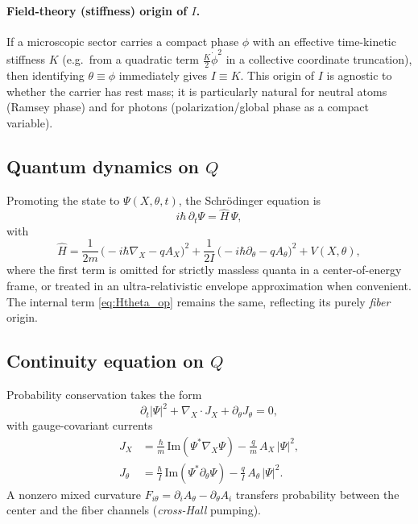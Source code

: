 \paragraph{Field-theory (stiffness) origin of $I$.}
If a microscopic sector carries a compact phase $\phi$ with an effective time-kinetic stiffness $K$
(e.g.\ from a quadratic term $\tfrac{K}{2}\dot\phi^2$ in a collective coordinate truncation), then identifying
$\theta\equiv \phi$ immediately gives $I\equiv K$. This origin of $I$ is agnostic to whether the carrier
has rest mass; it is particularly natural for neutral atoms (Ramsey phase) and for photons
(polarization/global phase as a compact variable).

\subsection{Quantum dynamics on $Q$}
Promoting the state to $\Psi(X,\theta,t)$, the Schrödinger equation is
\begin{equation}
i\hbar\,\partial_t \Psi=\hat H\,\Psi,
\end{equation}
with
\begin{equation}
\hat H=\frac{1}{2m}\,\big(-i\hbar\nabla_X-qA_X\big)^2
      +\frac{1}{2I}\,\big(-i\hbar\partial_\theta-qA_\theta\big)^2
      +V(X,\theta),
\label{eq:full_H}
\end{equation}
where the first term is omitted for strictly massless quanta in a center-of-energy frame, or treated in an
ultra-relativistic envelope approximation when convenient. The internal term
\eqref{eq:Htheta_op} remains the same, reflecting its purely \emph{fiber} origin.

\subsection{Continuity equation on $Q$}
Probability conservation takes the form
\begin{equation}
\partial_t|\Psi|^2+\nabla_X\!\cdot J_X+\partial_\theta J_\theta=0,
\end{equation}
with gauge-covariant currents
\begin{align}
J_X&=\frac{\hbar}{m}\,\text{Im}(\Psi^\ast\nabla_X\Psi)-\frac{q}{m}\,A_X\,|\Psi|^2,\\
J_\theta&=\frac{\hbar}{I}\,\text{Im}(\Psi^\ast\partial_\theta\Psi)-\frac{q}{I}\,A_\theta\,|\Psi|^2.
\end{align}
A nonzero mixed curvature $F_{i\theta}=\partial_iA_\theta-\partial_\theta A_i$ transfers probability between the
center and the fiber channels (\emph{cross-Hall} pumping).

